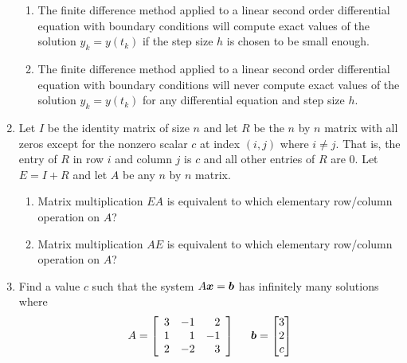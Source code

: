 \begin{enumerate}[leftmargin=*]
\begin{enumerate}
\item The finite difference method applied to a linear second order differential equation with boundary conditions will compute exact values of the solution $y_k = y(t_k)$ if the step size $h$ is chosen to be small enough.
\item The finite difference method applied to a linear second order differential equation with boundary conditions  will never compute exact values of the solution $y_k = y(t_k)$ for any differential equation and step size $h$.
\end{enumerate}

\item Let $I$ be the identity matrix of size $n$ and let $R$ be the $n$ by $n$ matrix with all zeros except for the nonzero scalar $c$ at index $(i,j)$ where $i \not= j$. That is, the entry of $R$ in row $i$ and column $j$ is $c$ and all other entries of $R$ are 0. Let $E = I + R$ and let $A$ be any $n$ by $n$ matrix.
\begin{enumerate}
\item Matrix multiplication $EA$ is equivalent to which elementary row/column operation on $A$?
\item Matrix multiplication $AE$ is equivalent to which elementary row/column operation on $A$?
\end{enumerate}


\item Find a value $c$ such that the system $A \boldsymbol{x} = \boldsymbol{b}$ has infinitely many solutions where
$$
A = \left[ \begin{array}{rrr} 3 & -1 & 2 \\ 1 & 1 & -1 \\ 2 & -2 & 3 \end{array} \right]
\hspace{5mm}
\boldsymbol{b} = \begin{bmatrix} 3 \\ 2 \\ c \end{bmatrix}
$$


\end{enumerate}

